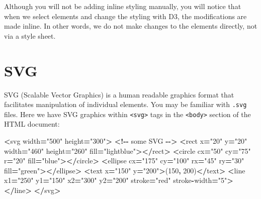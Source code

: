 \documentclass[
  openany]{book}
\newenvironment{Shaded}{\begin{snugshade}}{\end{snugshade}}
\newcommand{\DecValTok}[1]{\textcolor[rgb]{0.00,0.00,0.81}{#1}}
\newcommand{\NormalTok}[1]{#1}
\newcommand{\OperatorTok}[1]{\textcolor[rgb]{0.81,0.36,0.00}{\textbf{#1}}}
\newcommand{\StringTok}[1]{\textcolor[rgb]{0.31,0.60,0.02}{#1}}
\begin{document}
Although you will not be adding inline styling manually, you will notice that when we select elements and change the styling with D3, the modifications are made inline. In other words, we do not make changes to the elements directly, not via a style sheet.

\hypertarget{svg}{%
\section{\texorpdfstring{SVG }{SVG }}\label{svg}}

SVG (Scalable Vector Graphics) is a human readable graphics format that facilitates manipulation of individual elements. You may be familiar with \texttt{.svg} files. Here we have SVG graphics within \texttt{\textless{}svg\textgreater{}} tags in the \texttt{\textless{}body\textgreater{}} section of the HTML document:

\begin{Shaded}
\begin{Highlighting}[]
\OperatorTok{\textless{}}\NormalTok{svg width}\OperatorTok{=}\StringTok{"500"}\NormalTok{ height}\OperatorTok{=}\StringTok{"300"}\OperatorTok{\textgreater{}}  \OperatorTok{\textless{}!{-}{-}}\NormalTok{ some SVG }\OperatorTok{{-}{-}\textgreater{}}
    \OperatorTok{\textless{}}\NormalTok{rect x}\OperatorTok{=}\StringTok{"20"}\NormalTok{ y}\OperatorTok{=}\StringTok{"20"}\NormalTok{ width}\OperatorTok{=}\StringTok{"460"}\NormalTok{ height}\OperatorTok{=}\StringTok{"260"}\NormalTok{ fill}\OperatorTok{=}\StringTok{"lightblue"}\OperatorTok{\textgreater{}\textless{}/}\NormalTok{rect}\OperatorTok{\textgreater{}}
    \OperatorTok{\textless{}}\NormalTok{circle cx}\OperatorTok{=}\StringTok{"50"}\NormalTok{ cy}\OperatorTok{=}\StringTok{"75"}\NormalTok{ r}\OperatorTok{=}\StringTok{"20"}\NormalTok{ fill}\OperatorTok{=}\StringTok{"blue"}\OperatorTok{\textgreater{}\textless{}/}\NormalTok{circle}\OperatorTok{\textgreater{}}
    \OperatorTok{\textless{}}\NormalTok{ellipse cx}\OperatorTok{=}\StringTok{"175"}\NormalTok{ cy}\OperatorTok{=}\StringTok{"100"}\NormalTok{ rx}\OperatorTok{=}\StringTok{"45"}\NormalTok{ ry}\OperatorTok{=}\StringTok{"30"}\NormalTok{ fill}\OperatorTok{=}\StringTok{"green"}\OperatorTok{\textgreater{}\textless{}/}\NormalTok{ellipse}\OperatorTok{\textgreater{}}
    \OperatorTok{\textless{}}\NormalTok{text x}\OperatorTok{=}\StringTok{"150"}\NormalTok{ y}\OperatorTok{=}\StringTok{"200"}\OperatorTok{\textgreater{}}\NormalTok{(}\DecValTok{150}\OperatorTok{,} \DecValTok{200}\NormalTok{)}\OperatorTok{\textless{}/}\NormalTok{text}\OperatorTok{\textgreater{}}
    \OperatorTok{\textless{}}\NormalTok{line x1}\OperatorTok{=}\StringTok{"250"}\NormalTok{ y1}\OperatorTok{=}\StringTok{"150"}\NormalTok{ x2}\OperatorTok{=}\StringTok{"300"}\NormalTok{ y2}\OperatorTok{=}\StringTok{"200"}\NormalTok{ stroke}\OperatorTok{=}\StringTok{"red"}\NormalTok{ stroke}\OperatorTok{{-}}\NormalTok{width}\OperatorTok{=}\StringTok{"5"}\OperatorTok{\textgreater{}\textless{}/}\NormalTok{line}\OperatorTok{\textgreater{}}
\OperatorTok{\textless{}/}\NormalTok{svg}\OperatorTok{\textgreater{}}
\end{Highlighting}
\end{Shaded}
\end{document}

